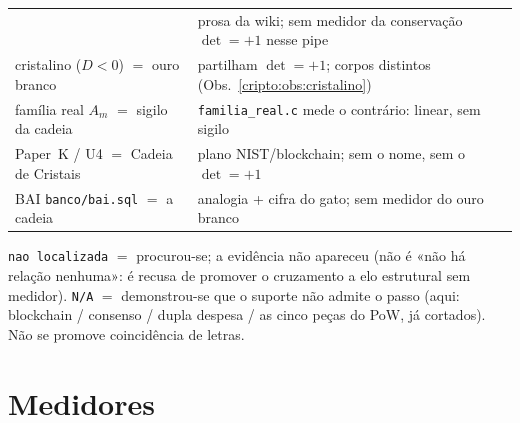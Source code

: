 \documentclass[11pt,a4paper]{article}
\newcommand{\code}[1]{\texttt{\small #1}}
\begin{document}
\begin{center}
\begin{tabular}{@{}p{}p{}@{}}
  & prosa da wiki; sem medidor da conservação $\det=+1$ nesse pipe \\
cristalino ($D<0$) $=$ ouro branco
  & partilham $\det=+1$; corpos distintos
    (Obs.~\ref{cripto:obs:cristalino}) \\
família real $A_m$ $=$ sigilo da cadeia
  & \code{familia\_real.c} mede o contrário: linear, sem sigilo \\
Paper~K / U4 $=$ Cadeia de Cristais
  & plano NIST/blockchain; sem o nome, sem o $\det=+1$ \\
BAI \code{banco/bai.sql} $=$ a cadeia
  & analogia + cifra do gato; sem medidor do ouro branco \\
\bottomrule
\end{tabular}
\end{center}

\noindent
\texttt{nao localizada} $=$ procurou-se; a evidência não apareceu
(não é «não há relação nenhuma»: é recusa de promover o cruzamento
a elo estrutural sem medidor).
\texttt{N/A} $=$ demonstrou-se que o suporte não admite o passo
(aqui: blockchain / consenso / dupla despesa / as cinco peças do PoW,
já cortados).
Não se promove coincidência de letras.

\section{Medidores}\label{cripto:medidores}
\end{document}
